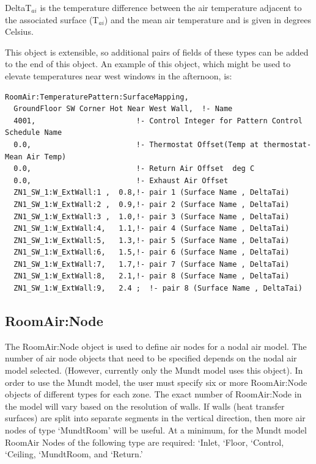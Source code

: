 DeltaT\(_{ai}\) is the temperature difference between the air temperature adjacent to the associated surface (T\(_{ai}\)) and the mean air temperature and is given in degrees Celsius.

This object is extensible, so additional pairs of fields of these types can be added to the end of this object.  An example of this object, which might be used to elevate temperatures near west windows in the afternoon, is:

\begin{lstlisting}
RoomAir:TemperaturePattern:SurfaceMapping,
  GroundFloor SW Corner Hot Near West Wall,  !- Name
  4001,                       !- Control Integer for Pattern Control Schedule Name
  0.0,                        !- Thermostat Offset(Temp at thermostat- Mean Air Temp)
  0.0,                        !- Return Air Offset  deg C
  0.0,                        !- Exhaust Air Offset
  ZN1_SW_1:W_ExtWall:1 ,  0.8,!- pair 1 (Surface Name , DeltaTai)
  ZN1_SW_1:W_ExtWall:2 ,  0.9,!- pair 2 (Surface Name , DeltaTai)
  ZN1_SW_1:W_ExtWall:3 ,  1.0,!- pair 3 (Surface Name , DeltaTai)
  ZN1_SW_1:W_ExtWall:4,   1.1,!- pair 4 (Surface Name , DeltaTai)
  ZN1_SW_1:W_ExtWall:5,   1.3,!- pair 5 (Surface Name , DeltaTai)
  ZN1_SW_1:W_ExtWall:6,   1.5,!- pair 6 (Surface Name , DeltaTai)
  ZN1_SW_1:W_ExtWall:7,   1.7,!- pair 7 (Surface Name , DeltaTai)
  ZN1_SW_1:W_ExtWall:8,   2.1,!- pair 8 (Surface Name , DeltaTai)
  ZN1_SW_1:W_ExtWall:9,   2.4 ;  !- pair 8 (Surface Name , DeltaTai)
\end{lstlisting}

\subsection{RoomAir:Node}\label{roomairnode}

The RoomAir:Node object is used to define air nodes for a nodal air model. The number of air node objects that need to be specified depends on the nodal air model selected. (However, currently only the Mundt model uses this object). In order to use the Mundt model, the user must specify six or more RoomAir:Node objects of different types for each zone. The exact number of RoomAir:Node in the model will vary based on the resolution of walls. If walls (heat transfer surfaces) are split into separate segments in the vertical direction, then more air nodes of type `MundtRoom' will be useful. At a minimum, for the Mundt model RoomAir Nodes of the following type are required: `Inlet, `Floor, `Control, `Ceiling, `MundtRoom, and `Return.'


